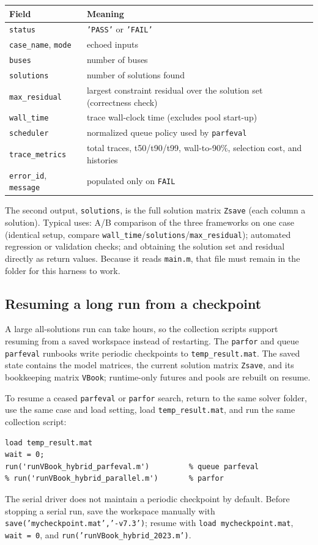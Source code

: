 \documentclass[11pt,a4paper]{article}
\newcommand{\code}[1]{\texttt{#1}}
\begin{document}
\begin{center}\small
\begin{tabular}{@{}ll@{}}
\toprule
Field & Meaning\\
\midrule
\code{status} & \code{'PASS'} or \code{'FAIL'}\\
\code{case_name}, \code{mode} & echoed inputs\\
\code{buses} & number of buses\\
\code{solutions} & number of solutions found\\
\code{max_residual} & largest constraint residual over the solution set (correctness check)\\
\code{wall_time} & trace wall-clock time (excludes pool start-up)\\
\code{scheduler} & normalized queue policy used by \code{parfeval}\\
\code{trace_metrics} & total traces, t50/t90/t99, wall-to-90\%, selection cost, and histories\\
\code{error_id}, \code{message} & populated only on \code{FAIL}\\
\bottomrule
\end{tabular}
\end{center}
The second output, \code{solutions}, is the full solution matrix \code{Zsave} (each column
a solution). Typical uses: A/B comparison of the three frameworks on one case (identical
setup, compare \code{wall_time}/\code{solutions}/\code{max_residual}); automated
regression or validation checks; and obtaining the solution set and residual directly as
return values. Because it reads \code{main.m}, that file must remain in the folder for
this harness to work.

\subsection{Resuming a long run from a checkpoint}\label{sec:resume}
A large all-solutions run can take hours, so the collection scripts support resuming from a
saved workspace instead of restarting. The \code{parfor} and queue \code{parfeval} runbooks
write periodic checkpoints to \code{temp_result.mat}. The saved state contains the model
matrices, the current solution matrix \code{Zsave}, and its bookkeeping matrix \code{VBook};
runtime-only futures and pools are rebuilt on resume.

To resume a ceased \code{parfeval} or \code{parfor} search, return to the same solver
folder, use the same case and load setting, load \code{temp_result.mat}, and run the same
collection script:
\begin{lstlisting}[style=mat]
load temp_result.mat
wait = 0;
run('runVBook_hybrid_parfeval.m')         % queue parfeval
% run('runVBook_hybrid_parallel.m')       % parfor
\end{lstlisting}
The serial driver does not maintain a periodic checkpoint by default. Before stopping a
serial run, save the workspace manually with \code{save('mycheckpoint.mat','-v7.3')}; resume
with \code{load mycheckpoint.mat}, \code{wait = 0}, and
\code{run('runVBook_hybrid_2023.m')}.
\end{document}
